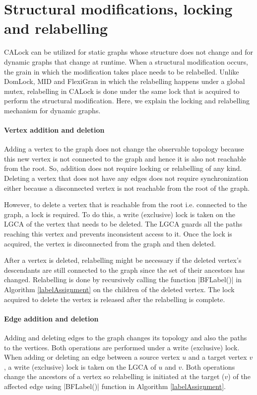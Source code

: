 \section{Structural modifications, locking and relabelling}

CALock can be utilized for static graphs whose structure does not change and for dynamic graphs that change at runtime. 
When a structural modification occurs, the grain in which the modification takes place needs to be relabelled. 
Unlike DomLock, MID and FlexiGran in which the relabelling happens under a global mutex, relabelling in CALock is done under the same lock that is acquired to perform the structural modification. 
Here, we explain the locking and relabelling mechanism for dynamic graphs.

\paragraph*{Vertex addition and deletion}
Adding a vertex to the graph does not change the observable topology because this new vertex is not connected to the graph and hence it is also not reachable from the root. 
So, addition does not require locking or relabelling of any kind. 
Deleting a vertex that does not have any edges does not require synchronization either because a disconnected vertex is not reachable from the root of the graph.

However, to delete a vertex that is reachable from the root i.e. connected to the graph, a lock is required. 
To do this, a write (exclusive) lock is taken on the LGCA of the vertex that needs to be deleted. 
The LGCA guards all the paths reaching this vertex and prevents inconsistent access to it. 
Once the lock is acquired, the vertex is disconnected from the graph and then deleted.

After a vertex is deleted, relabelling might be necessary if the deleted vertex's descendants are still connected to the graph since the set of their ancestors has changed. Relabelling is done by recursively calling the function \inline|BFLabel()| in Algorithm \ref{labelAssignment} on the children of the deleted vertex. 
The lock acquired to delete the vertex is released after the relabelling is complete.

\paragraph*{Edge addition and deletion}
Adding and deleting edges to the graph changes its topology and also the paths to the vertices. 
Both operations are performed under a write (exclusive) lock. 
When adding or deleting an edge between a source vertex $u$ and a target vertex $v$, a write (exclusive) lock is taken on the LGCA of $u$ and $v$. 
Both operations change the ancestors of a vertex so relabelling is initiated at the target ($v$) of the affected edge using \inline|BFLabel()| function in Algorithm \ref{labelAssignment}.


